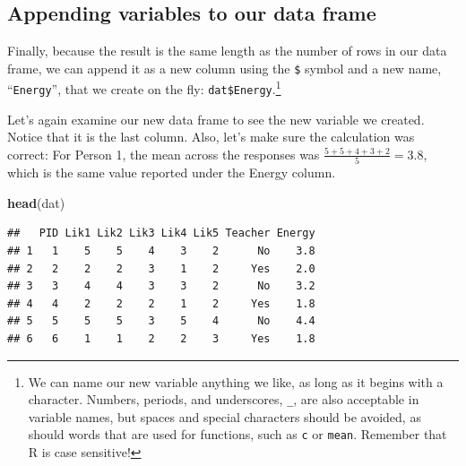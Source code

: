\documentclass[
]{article}
\newenvironment{Shaded}{\begin{snugshade}}{\end{snugshade}}
\newcommand{\DecValTok}[1]{\textcolor[rgb]{0.00,0.00,0.81}{#1}}
\newcommand{\KeywordTok}[1]{\textcolor[rgb]{0.13,0.29,0.53}{\textbf{#1}}}
\newcommand{\NormalTok}[1]{#1}
\newcommand{\OperatorTok}[1]{\textcolor[rgb]{0.81,0.36,0.00}{\textbf{#1}}}
\newcommand{\StringTok}[1]{\textcolor[rgb]{0.31,0.60,0.02}{#1}}
\begin{document}
\begin{Shaded}
\end{Shaded}

\hypertarget{appending-variables-to-our-data-frame}{%
\subsection{Appending variables to our data frame}\label{appending-variables-to-our-data-frame}}

Finally, because the result is the same length as the number of rows in our data frame, we can append it as a new column using the \texttt{\$} symbol and a new name, ``\texttt{Energy}'', that we create on the fly: \texttt{dat\$Energy}.\footnote{We can name our new variable anything we like, as long as it begins with a character. Numbers, periods, and underscores, \texttt{\_}, are also acceptable in variable names, but spaces and special characters should be avoided, as should words that are used for functions, such as \texttt{c} or \texttt{mean}. Remember that R is case sensitive!}

Let's again examine our new data frame to see the new variable we created. Notice that it is the last column. Also, let's make sure the calculation was correct: For Person 1, the mean across the responses was \(\frac{5+5+4+3+2}{5}=3.8\), which is the same value reported under the Energy column.

\begin{Shaded}
\begin{Highlighting}[]
\KeywordTok{head}\NormalTok{(dat)}
\end{Highlighting}
\end{Shaded}

\begin{verbatim}
##   PID Lik1 Lik2 Lik3 Lik4 Lik5 Teacher Energy
## 1   1    5    5    4    3    2      No    3.8
## 2   2    2    2    3    1    2     Yes    2.0
## 3   3    4    4    3    3    2      No    3.2
## 4   4    2    2    2    1    2     Yes    1.8
## 5   5    5    5    3    5    4      No    4.4
## 6   6    1    1    2    2    3     Yes    1.8
\end{verbatim}
\end{document}
